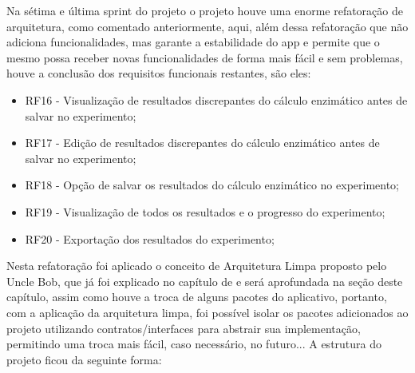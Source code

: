 Na sétima e última sprint do projeto o projeto houve uma enorme refatoração de arquitetura, como comentado anteriormente, aqui, além dessa refatoração que não adiciona funcionalidades, mas garante a estabilidade do \ac{app} e permite que o mesmo possa receber novas funcionalidades de forma mais fácil e sem problemas, houve a conclusão dos requisitos funcionais restantes, são eles:
\begin{itemize}
   \item RF16 - Visualização de resultados discrepantes do cálculo enzimático antes de salvar no experimento;
   \item RF17 - Edição de resultados discrepantes do cálculo enzimático antes de salvar no experimento;
   \item RF18 - Opção de salvar os resultados do cálculo enzimático no experimento;
   \item RF19 - Visualização de todos os resultados e o progresso do experimento;
   \item RF20 - Exportação dos resultados do experimento;
 \end{itemize}

 Nesta refatoração foi aplicado o conceito de Arquitetura Limpa proposto pelo Uncle Bob, que já foi explicado no capítulo de  e será aprofundada na seção  deste capítulo, assim como houve a troca de alguns pacotes do aplicativo, portanto, com a aplicação da arquitetura limpa, foi possível isolar os pacotes adicionados ao projeto utilizando contratos/interfaces para abstrair sua implementação, permitindo uma troca mais fácil, caso necessário, no futuro... A estrutura do projeto ficou da seguinte forma:


